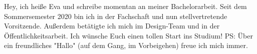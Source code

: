 \begin{multicols}{2}
{
Hey, ich heiße Eva und schreibe momentan an meiner Bachelorarbeit. Seit dem Sommersemester 2020 bin ich in der Fachschaft und nun stellvertretende Vorsitzende. Außerdem betätigte ich mich im Design-Team und in der Öffentlichkeitsarbeit. 
Ich wünsche Euch einen tollen Start ins Studium! PS: Über ein freundliches "Hallo" (auf dem Gang, im Vorbeigehen) freue ich mich immer.
} 

\vspace{-1.1cm}


\end{multicols}
